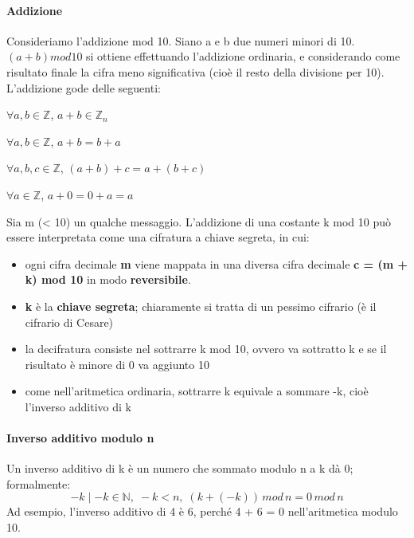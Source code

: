 \paragraph{Addizione}
Consideriamo l'addizione mod 10. Siano a e b due numeri minori di 10. $(a + b)mod10$ si ottiene effettuando l'addizione ordinaria, e considerando come risultato finale la cifra meno significativa (cioè il resto della divisione per 10). L'addizione gode delle seguenti:
\begin{prop}
$\forall a,b \in \mathbb{Z}$, $a + b \in \mathbb{Z}_n$ 
\end{prop}
\begin{prop}[(Commutativa)]
$\forall a,b \in \mathbb{Z}$, $a + b = b + a$ 
\end{prop}
\begin{prop}[(Associativa)]
$\forall a,b,c \in \mathbb{Z}$, $(a + b) + c = a + (b + c)$ 
\end{prop}
\begin{prop}
$\forall a \in \mathbb{Z}$, $a + 0 = 0 + a = a$ 
\end{prop}
Sia m (< 10) un qualche messaggio. L'addizione di una costante k mod 10 può essere interpretata come una cifratura a chiave segreta, in cui:
\begin{itemize}
\item ogni cifra decimale \textbf{m} viene mappata in una diversa cifra decimale \textbf{c = (m + k) mod 10} in modo \textbf{reversibile}.
\item \textbf{k} è la \textbf{chiave segreta}; chiaramente si tratta di un pessimo cifrario (è il cifrario di Cesare)
\item la decifratura consiste nel sottrarre k mod 10, ovvero va sottratto k e se il risultato è minore di 0 va aggiunto 10
\item come nell'aritmetica ordinaria, sottrarre k equivale a sommare -k, cioè l'inverso additivo di k
\end{itemize}

\paragraph{Inverso additivo modulo n}
Un inverso additivo di k è un numero che sommato modulo n a k dà 0; formalmente: 
\begin{equation}
-k \mid -k \in \mathbb{N},\; -k < n,\; (k + (-k)) \, mod \, n = 0 \, mod \, n
\end{equation}
Ad esempio, l'inverso additivo di 4 è 6, perché 4 + 6 = 0 nell'aritmetica modulo 10.

